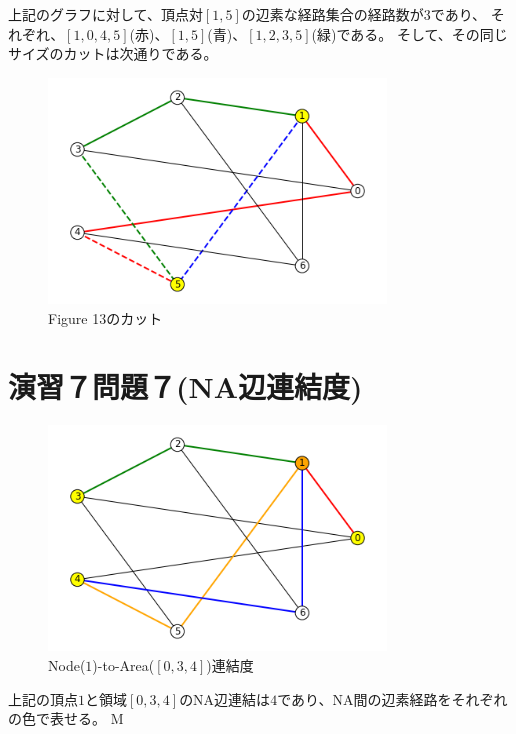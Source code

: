 \documentclass{report}
\begin{document}
\begin{CJK}{UTF8}{min}
    上記のグラフに対して、頂点対$[1,5]$の辺素な経路集合の経路数が$3$であり、
    それぞれ、$[1,0,4,5]$(赤)、$[1,5]$(青)、$[1,2,3,5]$(緑)である。
    そして、その同じサイズのカットは次通りである。
    \begin{figure}[!h]
        \centerline{\includegraphics[width=0.8\textwidth]{data/14.png}}
        \caption{Figure 13のカット}
    \end{figure}


    \clearpage
    \section*{演習７問題７(NA辺連結度)}
    \begin{figure}[!h]
        \centerline{\includegraphics[width=0.8\textwidth]{data/15.png}}
        \caption{Node($1$)-to-Area($[ 0,3,4 ]$)連結度}
    \end{figure}
    上記の頂点$1$と領域$[0,3,4]$のNA辺連結は$4$であり、NA間の辺素経路をそれぞれの色で表せる。
M
    \clearpage

\end{CJK}
\end{document}
